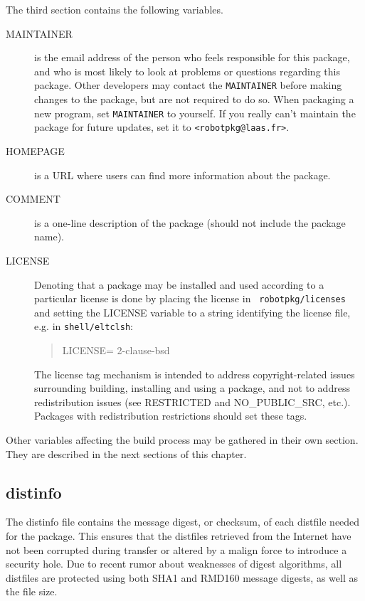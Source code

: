 The third section contains the following variables.

\begin{description}

   \item[MAINTAINER] is the email address of the person who feels responsible
   for this package, and who is most likely to look at problems or questions
   regarding this package. Other developers may contact the {\tt MAINTAINER}
   before making changes to the package, but are not required to do so. When
   packaging a new program, set {\tt MAINTAINER} to yourself. If you really
   can't maintain the package for future updates, set it to
   {\tt \string<robotpkg@laas.fr\string>}.

   \smallbreak
   \item[HOMEPAGE] is a URL where users can find more information about the
   package.

   \smallbreak
   \item[COMMENT] is a one-line description of the package (should not include
   the package name).

   \smallbreak
   \item[LICENSE] Denoting that a package may be installed and used according
   to a particular license is done by placing the license in {\tt
   robotpkg/licenses} and setting the LICENSE variable to a string identifying
   the license file, e.g. in {\tt shell/eltclsh}:
   \begin{quote}
      LICENSE=		2-clause-bsd
   \end{quote}

   The license tag mechanism is intended to address copyright-related issues
   surrounding building, installing and using a package, and not to address
   redistribution issues (see RESTRICTED and NO\_PUBLIC\_SRC, etc.). Packages
   with redistribution restrictions should set these tags.

\end{description}


Other variables affecting the build process may be gathered in their own
section. They are described in the next sections of this chapter.


\subsection{distinfo} %
\label{subsection:distinfo}

The distinfo file contains the message digest, or checksum, of each distfile
needed for the package. This ensures that the distfiles retrieved from the
Internet have not been corrupted during transfer or altered by a malign force
to introduce a security hole. Due to recent rumor about weaknesses of digest
algorithms, all distfiles are protected using both SHA1 and RMD160 message
digests, as well as the file size.

